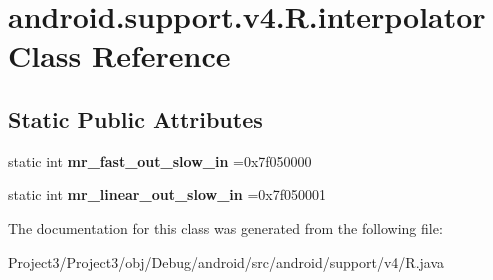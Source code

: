 \hypertarget{classandroid_1_1support_1_1v4_1_1R_1_1interpolator}{}\section{android.\+support.\+v4.\+R.\+interpolator Class Reference}
\label{classandroid_1_1support_1_1v4_1_1R_1_1interpolator}
\subsection*{Static Public Attributes}
\begin{DoxyCompactItemize}
\item 
\mbox{\label{classandroid_1_1support_1_1v4_1_1R_1_1interpolator_a514e7a42b08358dd6b61d1459b892b9d}} 
static int {\bfseries mr\+\_\+fast\+\_\+out\+\_\+slow\+\_\+in} =0x7f050000
\item 
\mbox{\label{classandroid_1_1support_1_1v4_1_1R_1_1interpolator_abf70c90f51d6ba90fd065a0641b84a14}} 
static int {\bfseries mr\+\_\+linear\+\_\+out\+\_\+slow\+\_\+in} =0x7f050001
\end{DoxyCompactItemize}


The documentation for this class was generated from the following file\+:\begin{DoxyCompactItemize}
\item 
Project3/\+Project3/obj/\+Debug/android/src/android/support/v4/R.\+java\end{DoxyCompactItemize}
